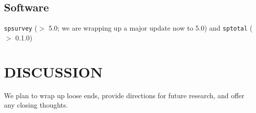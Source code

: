 \subsection{Software}

\texttt{spsurvey} ($>$ 5.0; we are wrapping up a major update now to 5.0) and \texttt{sptotal} ($>$ 0.1.0)


\section{\centering DISCUSSION}\label{sec:discussion}

We plan to wrap up loose ends, provide directions for future research, and offer any closing thoughts.




\clearpage






